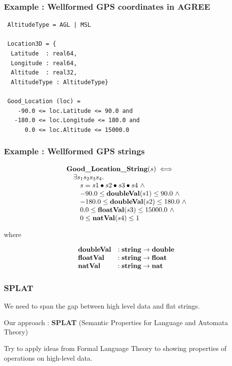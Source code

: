\documentclass{beamer}
\newcommand{\konst}[1]{\ensuremath{\mbox{\bf{#1}}}}
\begin{document}
\begin{frame}[fragile]\frametitle{Example : Wellformed GPS coordinates in AGREE}

{\small
\begin{verbatim}
 AltitudeType = AGL | MSL

 Location3D = {
  Latitude  : real64,
  Longitude : real64,
  Altitude  : real32,
  AltitudeType : AltitudeType}

 Good_Location (loc) =
    -90.0 <= loc.Latitude <= 90.0 and
   -180.0 <= loc.Longitude <= 180.0 and
      0.0 <= loc.Altitude <= 15000.0
\end{verbatim}
}

\end{frame}

\begin{frame}\frametitle{Example : Wellformed GPS strings}

\[
\begin{array}{l}
 \konst{Good\_Location\_String} (s) \iff \\
\quad   \exists s_1 s_2 s_3 s_4. \\
\qquad      s = s1 \bullet s2 \bullet s3 \bullet s4 \ \land \\
\qquad    -90.0 \leq \konst{doubleVal}(s1) \leq 90.0 \ \land \\
\qquad   -180.0 \leq \konst{doubleVal}(s2) \leq 180.0 \ \land \\
\qquad      0.0 \leq \konst{floatVal}(s3)  \leq 15000.0 \ \land \\
\qquad        0 \leq \konst{natVal}(s4) \leq 1
\end{array}
\]

\noindent where

\[
\begin{array}{ll}
 \konst{doubleVal} & : \konst{string} \to \konst{double} \\
 \konst{floatVal}  & : \konst{string} \to \konst{float}  \\
 \konst{natVal}    & : \konst{string} \to \konst{nat}  \\
\end{array}
\]

\end{frame}

\begin{frame}\frametitle{SPLAT}

We need to span the gap between high level data and flat strings.

Our approach : \textbf{SPLAT} (Semantic Properties for Language and Automata Theory)

Try to apply ideas from Formal Language Theory to showing properties
of operations on high-level data.

\end{frame}
\end{document}
